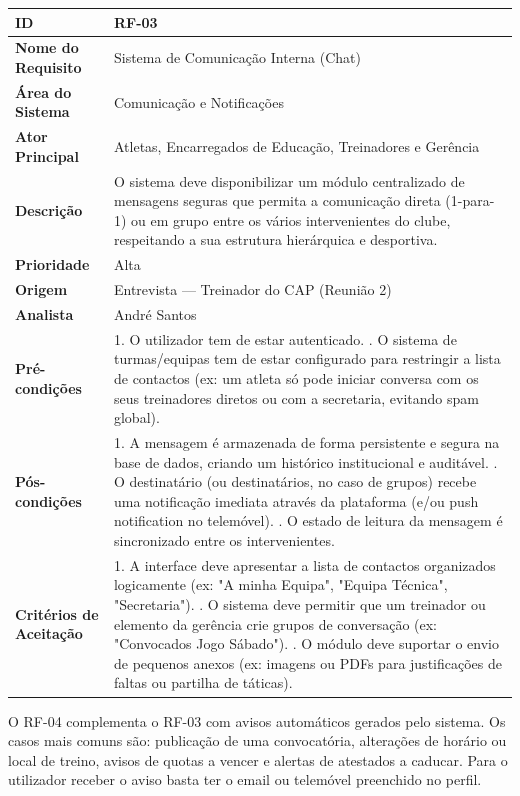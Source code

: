 {\begin{xltabular}{\textwidth}{|l|X|}
\textbf{ID} & RF-03 \\ \hline
\textbf{Nome do Requisito} & Sistema de Comunicação Interna (Chat) \\ \hline
\textbf{Área do Sistema} & Comunicação e Notificações \\ \hline
\textbf{Ator Principal} & Atletas, Encarregados de Educação, Treinadores e Gerência \\ \hline
\textbf{Descrição} & O sistema deve disponibilizar um módulo centralizado de mensagens seguras que permita a comunicação direta (1-para-1) ou em grupo entre os vários intervenientes do clube, respeitando a sua estrutura hierárquica e desportiva. \\ \hline
\textbf{Prioridade} & Alta \\ \hline
\textbf{Origem} & Entrevista --- Treinador do CAP (Reunião 2) \\ \hline
\textbf{Analista} & André Santos \\ \hline
\textbf{Pré-condições} & 1. O utilizador tem de estar autenticado. . O sistema de turmas/equipas tem de estar configurado para restringir a lista de contactos (ex: um atleta só pode iniciar conversa com os seus treinadores diretos ou com a secretaria, evitando spam global). \\ \hline
\textbf{Pós-condições} & 1. A mensagem é armazenada de forma persistente e segura na base de dados, criando um histórico institucional e auditável. . O destinatário (ou destinatários, no caso de grupos) recebe uma notificação imediata através da plataforma (e/ou push notification no telemóvel). . O estado de leitura da mensagem é sincronizado entre os intervenientes. \\ \hline
\textbf{Critérios de Aceitação} & 1. A interface deve apresentar a lista de contactos organizados logicamente (ex: "A minha Equipa", "Equipa Técnica", "Secretaria"). . O sistema deve permitir que um treinador ou elemento da gerência crie grupos de conversação (ex: "Convocados Jogo Sábado"). . O módulo deve suportar o envio de pequenos anexos (ex: imagens ou PDFs para justificações de faltas ou partilha de táticas). \\
\end{xltabular}
}


O RF-04 complementa o RF-03 com avisos automáticos gerados pelo sistema. Os casos mais comuns são: publicação de uma convocatória, alterações de horário ou local de treino, avisos de quotas a vencer e alertas de atestados a caducar. Para o utilizador receber o aviso basta ter o email ou telemóvel preenchido no perfil.

